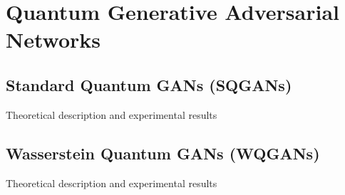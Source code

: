 \chapter{Quantum Generative Adversarial Networks}\label{chapter:quantum_gans}
\section{Standard Quantum GANs (SQGANs)}
Theoretical description and experimental results
\section{Wasserstein Quantum GANs (WQGANs)}
Theoretical description and experimental results

